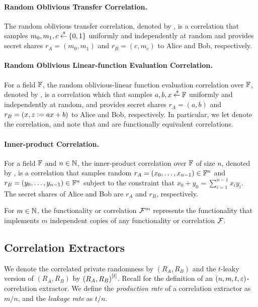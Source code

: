 \paragraph{Random Oblivious Transfer Correlation.}
The random oblivious transfer correlation, denoted by \ROT, is a correlation that samples $m_0,m_1,c \mathbin{\stackrel{\mbox{\,\tiny \$}}{\gets}} {\{0,1\}}$ uniformly and independently at random and provides secret shares $r_A = (m_0,m_1)$ and $r_B = (c,m_c)$ to Alice and Bob, respectively.

\paragraph{Random Oblivious Linear-function Evaluation Correlation.}
For a field ${\mathbb F}$, the random oblivious-linear function evaluation correlation over ${\mathbb F}$, denoted by \ROLE[\bbF], is a correlation which that samples $a,b,x \mathbin{\stackrel{\mbox{\,\tiny \$}}{\gets}} {\mathbb F}$ uniformly and independently at random, and provides secret shares $r_A = (a,b)$ and $r_B = (x, z {\;\vcentcolon=\;} ax+b)$ to Alice and Bob, respectively.
In particular, we let \ROLE denote the \ROLE[\GF{2}] correlation, and note that \ROT and \ROLE are functionally equivalent correlations.

\paragraph{Inner-product Correlation.}
For a field ${\mathbb F}$ and $n \in {\mathbb N}$, the inner-product correlation over ${\mathbb F}$ of size $n$, denoted by \IP[\bbF^n], is a correlation that samples random $r_A = (x_0,\dotsc, x_{n-1}) \in {\mathbb F}^n$ and $r_B = (y_0,\dotsc, y_{n-1}) \in {\mathbb F}^n$ subject to the constraint that $x_0 + y_0 = \sum_{i=1}^{n-1} x_iy_i$.
The secret shares of Alice and Bob are $r_A$ and $r_B$, respectively.

For $m \in {\mathbb N}$, the functionality or correlation ${\mathcal F}^m$ represents the functionality that implements $m$ independent copies of any functionality or correlation ${\mathcal F}$.

\subsection{Correlation Extractors}\label{sec:prelim-corr-ext}
We denote the correlated private randomness by $(R_A,R_B)$ and the $t$-leaky version of $(R_A,R_B)$ by $\left({R_A,R_B}\right)^{[t]}$.
Recall  for the definition of an $(n,m,t,\varepsilon)$-correlation extractor.
We define the {\em production rate} of a correlation extractor as $m/n$, and the {\em leakage rate} as $t/n$.

